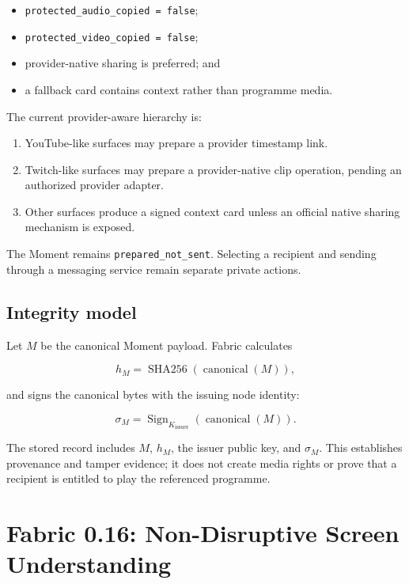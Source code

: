 \documentclass[11pt,a4paper]{article}
\begin{document}
\begin{itemize}[leftmargin=*]
  \item \texttt{protected\_audio\_copied = false};
  \item \texttt{protected\_video\_copied = false};
  \item provider-native sharing is preferred; and
  \item a fallback card contains context rather than programme media.
\end{itemize}

The current provider-aware hierarchy is:

\begin{enumerate}[leftmargin=*]
  \item YouTube-like surfaces may prepare a provider timestamp link.
  \item Twitch-like surfaces may prepare a provider-native clip operation,
        pending an authorized provider adapter.
  \item Other surfaces produce a signed context card unless an official native
        sharing mechanism is exposed.
\end{enumerate}

The Moment remains \texttt{prepared\_not\_sent}.  Selecting a recipient and
sending through a messaging service remain separate private actions.

\subsection{Integrity model}

Let $M$ be the canonical Moment payload.  Fabric calculates

\begin{equation}
 h_M = \operatorname{SHA256}(\operatorname{canonical}(M)),
\end{equation}

and signs the canonical bytes with the issuing node identity:

\begin{equation}
 \sigma_M = \operatorname{Sign}_{K_{\mathrm{issuer}}}
             (\operatorname{canonical}(M)).
\end{equation}

The stored record includes $M$, $h_M$, the issuer public key, and $\sigma_M$.
This establishes provenance and tamper evidence; it does not create media
rights or prove that a recipient is entitled to play the referenced programme.

\section{Fabric 0.16: Non-Disruptive Screen Understanding}
\end{document}
